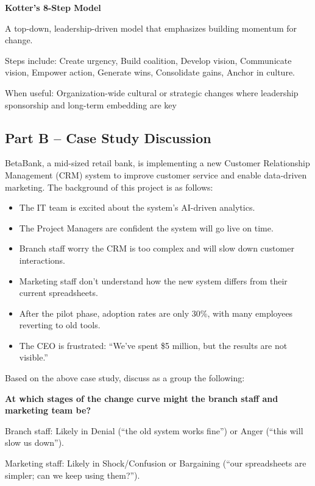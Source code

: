 \bigskip

\noindent\textbf{Kotter’s 8-Step Model}

A top-down, leadership-driven model that emphasizes building momentum for change.

Steps include: Create urgency, Build coalition, Develop vision, Communicate vision, Empower action, Generate wins, Consolidate gains, Anchor in culture.

When useful: Organization-wide cultural or strategic changes where leadership sponsorship and long-term embedding are key


\subsection{Part B – Case Study Discussion}

BetaBank, a mid-sized retail bank, is implementing a new Customer Relationship Management (CRM) system to improve customer service and enable data-driven marketing. The background of this project is as follows:

\begin{itemize}
    \item The IT team is excited about the system’s AI-driven analytics.
    \item The Project Managers are confident the system will go live on time.
    \item Branch staff worry the CRM is too complex and will slow down customer interactions.
    \item Marketing staff don’t understand how the new system differs from their current spreadsheets.
    \item After the pilot phase, adoption rates are only 30\%, with many employees reverting to old tools.
    \item The CEO is frustrated: “We’ve spent \$5 million, but the results are not visible.”
\end{itemize}

\bigskip

\noindent Based on the above case study, discuss as a group the following:

\noindent\textbf{At which stages of the change curve might the branch staff and marketing team be?}



Branch staff: Likely in Denial (“the old system works fine”) or Anger (“this will slow us down”).

Marketing staff: Likely in Shock/Confusion or Bargaining (“our spreadsheets are simpler; can we keep using them?”).



